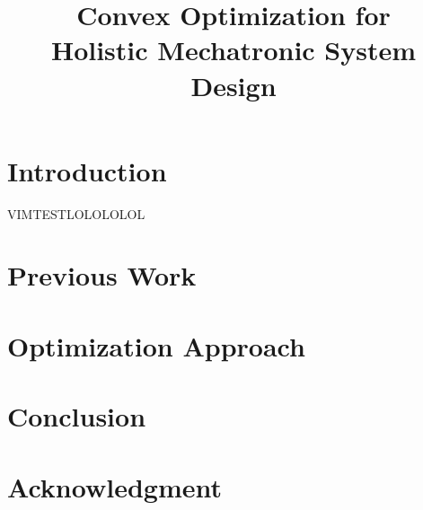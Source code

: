 \documentclass[conference]{IEEEtran}
\begin{document}
\title{Convex Optimization for \\Holistic Mechatronic System Design}



\maketitle %

\begin{abstract}

\end{abstract}

\section{Introduction}

VIMTESTLOLOLOLOL

\section{Previous Work}


\section{Optimization Approach}


\section{Conclusion}


\section*{Acknowledgment}







\end{document}
